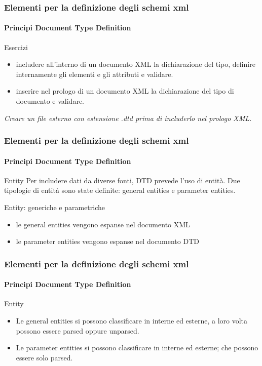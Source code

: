 \begin{frame}
    \frametitle{Elementi per la definizione degli schemi xml}
    \framesubtitle{Principi Document Type Definition}
    \addtocounter{nframe}{1}

    \begin{block}{Esercizi}
    \begin{itemize}
        \item includere all'interno di un documento XML la dichiarazione del tipo, definire internamente gli elementi e gli attributi e validare.
        \item inserire nel prologo di un documento XML la dichiarazione del tipo di documento e validare.
    \end{itemize}
    \end{block}

    \textit{Creare un file esterno con estensione .dtd prima di includerlo nel prologo XML.}

\end{frame}


\begin{frame}
    \frametitle{Elementi per la definizione degli schemi xml}
    \framesubtitle{Principi Document Type Definition}
    \addtocounter{nframe}{1}

    \begin{block}{Entity}
        Per includere dati da diverse fonti, DTD prevede l'uso di entità. Due tipologie di entità sono state definite: general entities e parameter entities.
    \end{block}

    \begin{block}{Entity: generiche e parametriche}
    \begin{itemize}
        \item le general entities vengono espanse nel documento XML
        \item le parameter entities vengono espanse nel documento DTD
    \end{itemize}
    \end{block}
    
\end{frame}

\begin{frame}
    \frametitle{Elementi per la definizione degli schemi xml}
    \framesubtitle{Principi Document Type Definition}
    \addtocounter{nframe}{1}

    \begin{block}{Entity}
    \begin{itemize}
        \item  Le general entities si possono classificare in interne ed esterne, a loro volta possono essere parsed oppure unparsed.
        \item Le parameter entities si possono classificare in interne ed esterne; che  possono essere solo parsed.
    \end{itemize}
    \end{block}
    
\end{frame}

